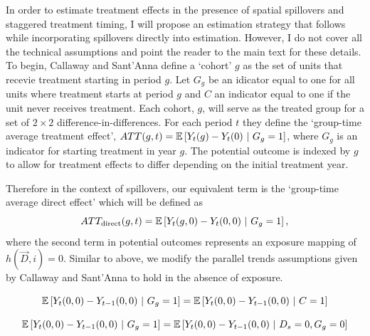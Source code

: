 \documentclass[11pt]{article}
\begin{document}
In order to estimate treatment effects in the presence of spatial spillovers and staggered treatment timing, I will propose an estimation strategy that follows \citet{Callaway_SantAnna_2020} while incorporating spillovers directly into estimation. However, I do not cover all the technical assumptions and point the reader to the main text for these details. To begin, Callaway and Sant'Anna define a `cohort' $g$ as the set of units that recevie treatment starting in period $g$. Let $G_g$ be an idicator equal to one for all units where treatment starts at period $g$ and $C$ an indicator equal to one if the unit never receives treatment. Each cohort, $g$, will serve as the treated group for a set of $2\times 2$ difference-in-differences. For each period $t$ they define the `group-time average treatment effect', $ATT(g,t) = \mathbb{E}\left[Y_t(g) - Y_t(0) \ \vert \ G_g = 1 \right]$, where $G_g$ is an indicator for starting treatment in year $g$. The potential outcome is indexed by $g$ to allow for treatment effects to differ depending on the initial treatment year.

Therefore in the context of spillovers, our equivalent term is the `group-time average direct effect' which will be defined as $$ 
    ATT_{\text{direct}}(g,t) = \mathbb{E}\left[Y_t(g, 0) - Y_t(0, 0) \ \vert \ G_g = 1 \right],
$$ where the second term in potential outcomes represents an exposure mapping of $h(\vec{D}, i) = 0$. Similar to above, we modify the parallel trends assumptions given by Callaway and Sant'Anna to hold in the absence of exposure. 

\begin{assumption}\label{assumption:parallel_es_never}
    $$
        \mathbb{E}\left[Y_t(0, 0) - Y_{t-1}(0, 0) \ \vert \ G_g = 1 \right] = \mathbb{E}\left[Y_t(0, 0) - Y_{t-1}(0, 0) \ \vert \ C = 1 \right] 
    $$ 
\end{assumption}

\begin{assumption}\label{assumption:parallel_es_notyet}
    $$ 
        \mathbb{E}\left[Y_t(0, 0) - Y_{t-1}(0, 0) \ \vert \ G_g = 1 \right] = \mathbb{E}\left[Y_t(0, 0) - Y_{t-1}(0, 0) \ \vert \ D_s = 0, G_g = 0 \right]
    $$ 
\end{assumption}
\end{document}
